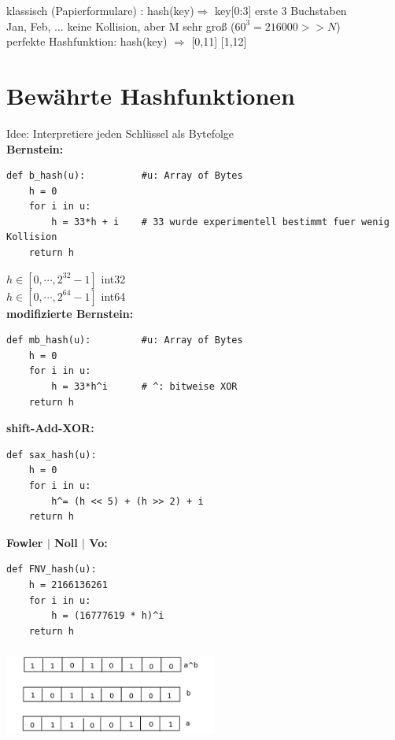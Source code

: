 klassisch (Papierformulare) : hash(key)$\Rightarrow$ key[0:3] erste 3 Buchstaben\\
\hspace*{5mm} Jan, Feb, ... \hspace*{2.3cm} keine Kollision, aber M sehr groß ($60^3 = 216000 >> N$) \\

perfekte Hashfunktion: hash(key) $\Rightarrow$ [0,11] \hspace*{5mm} [1,12] \\

\section{Bewährte Hashfunktionen}
Idee: Interpretiere jeden Schlüssel als Bytefolge\\

\textbf{Bernstein:}
\begin{verbatim}
def b_hash(u):          #u: Array of Bytes
    h = 0
    for i in u:
        h = 33*h + i    # 33 wurde experimentell bestimmt fuer wenig Kollision
    return h
\end{verbatim}
$h \in [0, \cdots, 2^{32} -1]$ int32 \\
$h \in [0, \cdots, 2^{64} -1]$ int64 \\


\textbf{modifizierte Bernstein:}
\begin{verbatim}
def mb_hash(u):         #u: Array of Bytes
    h = 0
    for i in u:
        h = 33*h^i      # ^: bitweise XOR
    return h
\end{verbatim}

\textbf{shift-Add-XOR:}
\begin{verbatim}
def sax_hash(u):
    h = 0
    for i in u:
        h^= (h << 5) + (h >> 2) + i
    return h
\end{verbatim}

\textbf{Fowler $|$ Noll $|$ Vo:}
\begin{verbatim}
def FNV_hash(u):
    h = 2166136261
    for i in u:
        h = (16777619 * h)^i
    return h
\end{verbatim}
\includegraphics[width=7cm,height=3cm,keepaspectratio]{./Pictures/abArrays.png}


